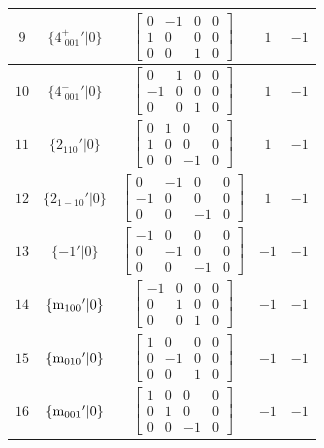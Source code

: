 \documentclass[fleqn,8pt]{jsarticle}
\begin{document}
\begin{longtable}{ccccc}
$ 9 $ & $ \{4^{+}_{\,\,001}{}'|0\} $ & $ \begin{bmatrix} 0 & -1 & 0 & 0 \\ 1 & 0 & 0 & 0 \\ 0 & 0 & 1 & 0 \end{bmatrix} $ & $ 1 $ & $ -1 $ \\ \hline
$ 10 $ & $ \{4^{-}_{\,\,001}{}'|0\} $ & $ \begin{bmatrix} 0 & 1 & 0 & 0 \\ -1 & 0 & 0 & 0 \\ 0 & 0 & 1 & 0 \end{bmatrix} $ & $ 1 $ & $ -1 $ \\ \hline
$ 11 $ & $ \{2{}_{110}{}'|0\} $ & $ \begin{bmatrix} 0 & 1 & 0 & 0 \\ 1 & 0 & 0 & 0 \\ 0 & 0 & -1 & 0 \end{bmatrix} $ & $ 1 $ & $ -1 $ \\ \hline
$ 12 $ & $ \{2{}_{1-10}{}'|0\} $ & $ \begin{bmatrix} 0 & -1 & 0 & 0 \\ -1 & 0 & 0 & 0 \\ 0 & 0 & -1 & 0 \end{bmatrix} $ & $ 1 $ & $ -1 $ \\ \hline
$ 13 $ & $ \{-1{}'|0\} $ & $ \begin{bmatrix} -1 & 0 & 0 & 0 \\ 0 & -1 & 0 & 0 \\ 0 & 0 & -1 & 0 \end{bmatrix} $ & $ -1 $ & $ -1 $ \\ \hline
$ 14 $ & $ \{{\rm m}_{100}{}'|0\} $ & $ \begin{bmatrix} -1 & 0 & 0 & 0 \\ 0 & 1 & 0 & 0 \\ 0 & 0 & 1 & 0 \end{bmatrix} $ & $ -1 $ & $ -1 $ \\ \hline
$ 15 $ & $ \{{\rm m}_{010}{}'|0\} $ & $ \begin{bmatrix} 1 & 0 & 0 & 0 \\ 0 & -1 & 0 & 0 \\ 0 & 0 & 1 & 0 \end{bmatrix} $ & $ -1 $ & $ -1 $ \\ \hline
$ 16 $ & $ \{{\rm m}_{001}{}'|0\} $ & $ \begin{bmatrix} 1 & 0 & 0 & 0 \\ 0 & 1 & 0 & 0 \\ 0 & 0 & -1 & 0 \end{bmatrix} $ & $ -1 $ & $ -1 $ \\ \hline

\end{longtable}
\end{document}
